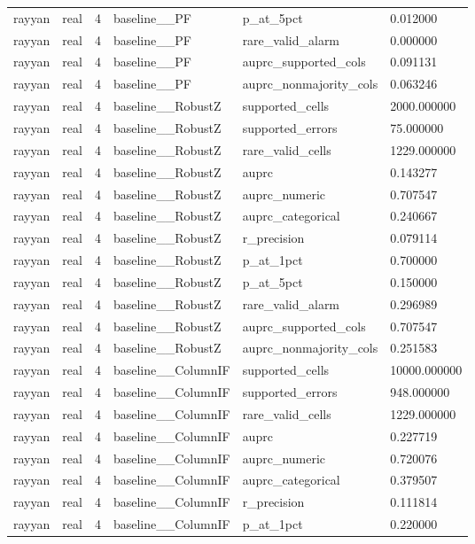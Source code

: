 \begin{tabular}{llllll}
rayyan & real & 4 & baseline\_\_PF & p\_at\_5pct & 0.012000 \\
rayyan & real & 4 & baseline\_\_PF & rare\_valid\_alarm & 0.000000 \\
rayyan & real & 4 & baseline\_\_PF & auprc\_supported\_cols & 0.091131 \\
rayyan & real & 4 & baseline\_\_PF & auprc\_nonmajority\_cols & 0.063246 \\
rayyan & real & 4 & baseline\_\_RobustZ & supported\_cells & 2000.000000 \\
rayyan & real & 4 & baseline\_\_RobustZ & supported\_errors & 75.000000 \\
rayyan & real & 4 & baseline\_\_RobustZ & rare\_valid\_cells & 1229.000000 \\
rayyan & real & 4 & baseline\_\_RobustZ & auprc & 0.143277 \\
rayyan & real & 4 & baseline\_\_RobustZ & auprc\_numeric & 0.707547 \\
rayyan & real & 4 & baseline\_\_RobustZ & auprc\_categorical & 0.240667 \\
rayyan & real & 4 & baseline\_\_RobustZ & r\_precision & 0.079114 \\
rayyan & real & 4 & baseline\_\_RobustZ & p\_at\_1pct & 0.700000 \\
rayyan & real & 4 & baseline\_\_RobustZ & p\_at\_5pct & 0.150000 \\
rayyan & real & 4 & baseline\_\_RobustZ & rare\_valid\_alarm & 0.296989 \\
rayyan & real & 4 & baseline\_\_RobustZ & auprc\_supported\_cols & 0.707547 \\
rayyan & real & 4 & baseline\_\_RobustZ & auprc\_nonmajority\_cols & 0.251583 \\
rayyan & real & 4 & baseline\_\_ColumnIF & supported\_cells & 10000.000000 \\
rayyan & real & 4 & baseline\_\_ColumnIF & supported\_errors & 948.000000 \\
rayyan & real & 4 & baseline\_\_ColumnIF & rare\_valid\_cells & 1229.000000 \\
rayyan & real & 4 & baseline\_\_ColumnIF & auprc & 0.227719 \\
rayyan & real & 4 & baseline\_\_ColumnIF & auprc\_numeric & 0.720076 \\
rayyan & real & 4 & baseline\_\_ColumnIF & auprc\_categorical & 0.379507 \\
rayyan & real & 4 & baseline\_\_ColumnIF & r\_precision & 0.111814 \\
rayyan & real & 4 & baseline\_\_ColumnIF & p\_at\_1pct & 0.220000 \\

\end{tabular}
